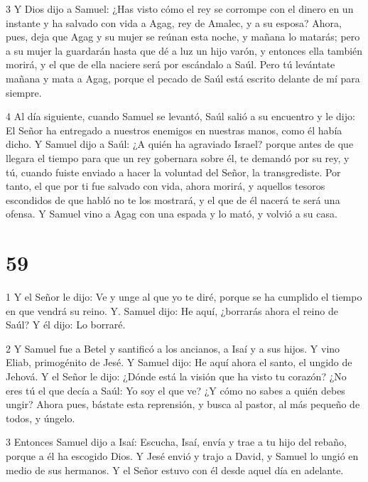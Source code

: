 \par 3 Y Dios dijo a Samuel: ¿Has visto cómo el rey se corrompe con el dinero en un instante y ha salvado con vida a Agag, rey de Amalec, y a su esposa? Ahora, pues, deja que Agag y su mujer se reúnan esta noche, y mañana lo matarás; pero a su mujer la guardarán hasta que dé a luz un hijo varón, y entonces ella también morirá, y el que de ella naciere será por escándalo a Saúl. Pero tú levántate mañana y mata a Agag, porque el pecado de Saúl está escrito delante de mí para siempre.

\par 4 Al día siguiente, cuando Samuel se levantó, Saúl salió a su encuentro y le dijo: El Señor ha entregado a nuestros enemigos en nuestras manos, como él había dicho. Y Samuel dijo a Saúl: ¿A quién ha agraviado Israel? porque antes de que llegara el tiempo para que un rey gobernara sobre él, te demandó por su rey, y tú, cuando fuiste enviado a hacer la voluntad del Señor, la transgrediste. Por tanto, el que por ti fue salvado con vida, ahora morirá, y aquellos tesoros escondidos de que habló no te los mostrará, y el que de él nacerá te será una ofensa. Y Samuel vino a Agag con una espada y lo mató, y volvió a su casa.

\chapter{59}

\par 1 Y el Señor le dijo: Ve y unge al que yo te diré, porque se ha cumplido el tiempo en que vendrá su reino. Y. Samuel dijo: He aquí, ¿borrarás ahora el reino de Saúl? Y él dijo: Lo borraré.

\par 2 Y Samuel fue a Betel y santificó a los ancianos, a Isaí y a sus hijos. Y vino Eliab, primogénito de Jesé. Y Samuel dijo: He aquí ahora el santo, el ungido de Jehová. Y el Señor le dijo: ¿Dónde está la visión que ha visto tu corazón? ¿No eres tú el que decía a Saúl: Yo soy el que ve? ¿Y cómo no sabes a quién debes ungir? Ahora pues, bástate esta reprensión, y busca al pastor, al más pequeño de todos, y úngelo.

\par 3 Entonces Samuel dijo a Isaí: Escucha, Isaí, envía y trae a tu hijo del rebaño, porque a él ha escogido Dios. Y Jesé envió y trajo a David, y Samuel lo ungió en medio de sus hermanos. Y el Señor estuvo con él desde aquel día en adelante.

